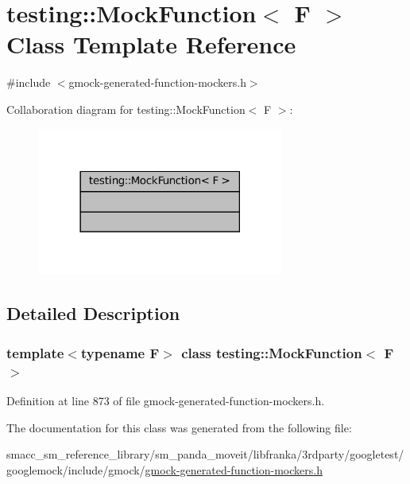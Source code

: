 \hypertarget{classtesting_1_1MockFunction}{}\section{testing\+:\+:Mock\+Function$<$ F $>$ Class Template Reference}
\label{classtesting_1_1MockFunction}


{\ttfamily \#include $<$gmock-\/generated-\/function-\/mockers.\+h$>$}



Collaboration diagram for testing\+:\+:Mock\+Function$<$ F $>$\+:
\nopagebreak
\begin{figure}[H]
\begin{center}
\leavevmode
\includegraphics[width=230pt]{classtesting_1_1MockFunction__coll__graph}
\end{center}
\end{figure}


\subsection{Detailed Description}
\subsubsection*{template$<$typename F$>$\newline
class testing\+::\+Mock\+Function$<$ F $>$}



Definition at line 873 of file gmock-\/generated-\/function-\/mockers.\+h.



The documentation for this class was generated from the following file\+:\begin{DoxyCompactItemize}
\item 
smacc\+\_\+sm\+\_\+reference\+\_\+library/sm\+\_\+panda\+\_\+moveit/libfranka/3rdparty/googletest/googlemock/include/gmock/\hyperlink{gmock-generated-function-mockers_8h}{gmock-\/generated-\/function-\/mockers.\+h}\end{DoxyCompactItemize}
